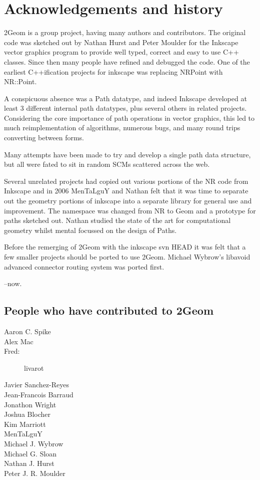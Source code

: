 \documentclass[openany]{book}
\begin{document}
\chapter{Acknowledgements and history}

2Geom is a group project, having many authors and contributors.  The
original code was sketched out by Nathan Hurst and Peter Moulder for
the Inkscape vector graphics program to provide well typed, correct
and easy to use C++ classes.  Since then many people have refined and
debugged the code.  One of the earliest C++ification projects for
inkscape was replacing NRPoint with NR::Point.

A conspicuous absence was a Path datatype, and indeed Inkscape
developed at least 3 different internal path datatypes, plus several
others in related projects.  Considering the core importance of path
operations in vector graphics, this led to much reimplementation of
algorithms, numerous bugs, and many round trips converting between
forms.

Many attempts have been made to try and develop a single path data
structure, but all were fated to sit in random SCMs scattered across
the web.

Several unrelated projects had copied out various portions of the NR
code from Inkscape and in 2006 MenTaLguY and Nathan felt that it was
time to separate out the geometry portions of inkscape into a
separate library for general use and improvement.  The namespace was
changed from NR to Geom and a prototype for paths sketched out.
Nathan studied the state of the art for computational geometry whilst
mental focussed on the design of Paths.

Before the remerging of 2Geom with the inkscape svn HEAD it was felt
that a few smaller projects should be ported to use 2Geom.  Michael
Wybrow's libavoid advanced connector routing system was ported first.

--now.

\pagebreak

\section{People who have contributed to 2Geom}
\begin{description}
\item[Aaron C. Spike]
\item[Alex Mac]
\item[Fred:] livarot
\item[Javier Sanchez-Reyes]
\item[Jean-Francois Barraud]
\item[Jonathon Wright]
\item[Joshua Blocher]
\item[Kim Marriott]
\item[MenTaLguY]
\item[Michael J. Wybrow]
\item[Michael G. Sloan]
\item[Nathan J. Hurst]
\item[Peter J. R. Moulder]
\end{description}
\end{document}
